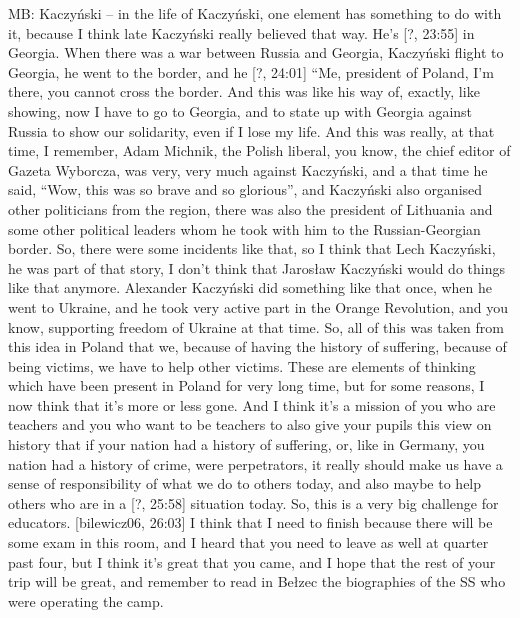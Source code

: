 MB: Kaczyński – in the life of Kaczyński, one element has something to do with it, because I think late Kaczyński really believed that way. He’s [?, 23:55] in Georgia. When there was a war between Russia and Georgia, Kaczyński flight to Georgia, he went to the border, and he [?, 24:01] “Me, president of Poland, I’m there, you cannot cross the border. And this was like his way of, exactly, like showing, now I have to go to Georgia, and to state up with Georgia against Russia to show our solidarity, even if I lose my life. And this was really, at that time, I remember, Adam Michnik, the Polish liberal, you know, the chief editor of Gazeta Wyborcza, was very, very much against Kaczyński,  and a that time he said, “Wow, this was so brave and so glorious”, and Kaczyński also organised other politicians from the region, there was also the president of Lithuania and some other political leaders whom he took with him to the Russian-Georgian border. So, there were some incidents like that, so I think that Lech Kaczyński, he was part of that story, I don’t think that Jarosław Kaczyński would do things like that anymore. Alexander Kaczyński did something like that once, when he went to Ukraine, and he took very active part in the Orange Revolution, and you know, supporting freedom of Ukraine at that time. So, all of this was taken from this idea in Poland that we, because of having the history of suffering, because of being victims, we have to help other victims. These are elements of thinking which have been present in Poland for very long time, but for some reasons, I now think that it’s more or less gone. And I think it’s a mission of you who are teachers and you who want to be teachers to also give your pupils this view on history that if your nation had a history of suffering, or, like in Germany, you nation had a history of crime, were perpetrators, it really should make us have a sense of responsibility of what we do to others today, and also maybe to help others who are in a [?, 25:58] situation today. So, this is a very big challenge for educators. [bilewicz06, 26:03] I think that I need to finish because there will be some exam in this room, and I heard that you need to leave as well at quarter past four, but I think it’s great that you came, and I hope that the rest of your trip will be great, and remember to read in Bełzec the biographies of the SS who were operating the camp. 